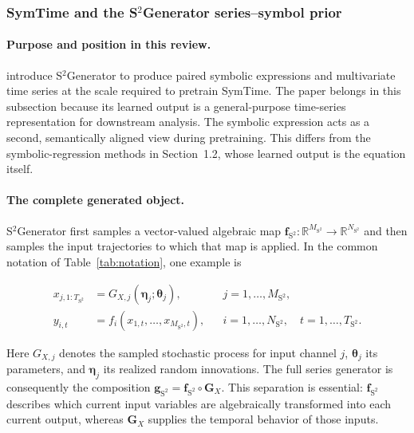 \subsubsection{SymTime and the \texorpdfstring{S$^2$}{S2}Generator
series--symbol prior}

\paragraph{Purpose and position in this review.}
\citet{wang2025symtime} introduce S$^2$Generator to produce paired symbolic
expressions and multivariate time series at the scale required to pretrain
SymTime. The paper belongs in this subsection because its learned output is a
general-purpose time-series representation for downstream analysis. The
symbolic expression acts as a second, semantically aligned view during
pretraining. This differs from the symbolic-regression methods in
Section~1.2, whose learned output is the equation itself.

\paragraph{The complete generated object.}
S$^2$Generator first samples a vector-valued algebraic map
$\mathbf f_{\mathrm{S^2}}:\mathbb R^{M_{\mathrm{S^2}}}\rightarrow
\mathbb R^{N_{\mathrm{S^2}}}$ and then samples the input trajectories to which
that map is applied. In the common notation of Table~\ref{tab:notation}, one
example is

\begin{equation}
\begin{aligned}
x_{j,1:T_{\mathrm{S^2}}}
  &=G_{X,j}(\boldsymbol\eta_j;\boldsymbol\theta_j),
  &&j=1,\ldots,M_{\mathrm{S^2}},\\
y_{i,t}
  &=f_i(x_{1,t},\ldots,x_{M_{\mathrm{S^2}},t}),
  &&i=1,\ldots,N_{\mathrm{S^2}},\quad
    t=1,\ldots,T_{\mathrm{S^2}}.
\end{aligned}
\label{eq:s2-complete-generator}
\end{equation}

Here $G_{X,j}$ denotes the sampled stochastic process for input channel $j$,
$\boldsymbol\theta_j$ its parameters, and $\boldsymbol\eta_j$ its realized
random innovations. The full series generator is consequently the composition
$\mathbf g_{\mathrm{S^2}}=\mathbf f_{\mathrm{S^2}}\circ\mathbf G_X$.
This separation is essential: $\mathbf f_{\mathrm{S^2}}$ describes which
current input variables are algebraically transformed into each current
output, whereas $\mathbf G_X$ supplies the temporal behavior of those inputs.

